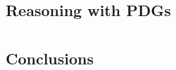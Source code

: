\documentclass[tocprelim,
    ]{cornellmodified}
\newif\iffoundations\foundationsfalse
\begin{document}
\chapter{Reasoning with PDGs}
    


\iffoundations
\part{Foundations} \label{part:foundations}

\chapter{Learner's Confidence}
    

\chapter{Relative Entropy Soup}
    

\chapter{The Category Theory of PDGs}
    
\fi

\part{}  \label{part:conclusions}
\chapter{Conclusions}
    \label{chap:end}
    


% 
% 

\end{document}
